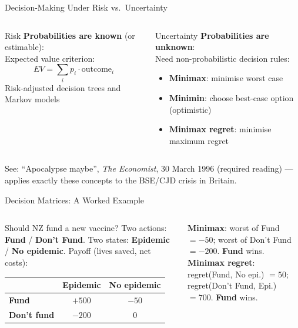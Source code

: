 \documentclass[aspectratio=169, 12pt]{beamer}
\begin{document}
\begin{frame}{Decision-Making Under Risk vs.\ Uncertainty}
  \begin{columns}
      \begin{block}{Risk}
        \textbf{Probabilities are known} (or estimable):\\[0.3em]
        Expected value criterion:
        $$EV = \sum_i p_i \cdot \text{outcome}_i$$
        \vspace{0.3em}
        Risk-adjusted decision trees and Markov models
      \end{block}
      \begin{alertblock}{Uncertainty}
        \textbf{Probabilities are unknown}:\\[0.3em]
        Need non-probabilistic decision rules:
        \begin{itemize}
          \item \textbf{Minimax}: minimise worst case
          \item \textbf{Minimin}: choose best-case option (optimistic)
          \item \textbf{Minimax regret}: minimise maximum regret
        \end{itemize}
      \end{alertblock}
  \end{columns}
  \vspace{0.4em}
  {\footnotesize See: ``Apocalypse maybe'', \textit{The Economist}, 30 March 1996 (required reading) --- applies exactly these concepts to the BSE/CJD crisis in Britain.}
\end{frame}

\begin{frame}{Decision Matrices: A Worked Example}
  \begin{columns}
      \begin{block}{Should NZ fund a new vaccine?}
        \small Two actions: \textbf{Fund} / \textbf{Don't Fund}. Two states: \textbf{Epidemic} / \textbf{No epidemic}. Payoff (lives saved, net costs):
        \begin{center}
          \footnotesize
          \begin{tabular}{@{}lcc@{}}
            \toprule
            & \textbf{Epidemic} & \textbf{No epidemic} \\
            \midrule
            \textbf{Fund} & $+500$ & $-50$ \\
            \textbf{Don't fund} & $-200$ & $0$ \\
            \bottomrule
          \end{tabular}
        \end{center}
      \end{block}
      \small
      \textbf{Minimax}: worst of Fund $= -50$; worst of Don't Fund $= -200$. \textbf{Fund} wins.\\[0.2em]
      \textbf{Minimax regret}: regret(Fund, No epi.) $= 50$; regret(Don't Fund, Epi.) $= 700$. \textbf{Fund} wins.
  \end{columns}
\end{frame}
\end{document}
